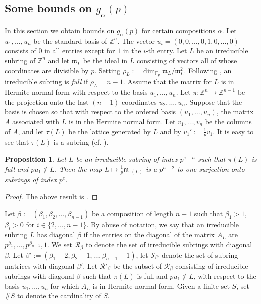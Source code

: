 \documentclass[a4paper]{amsart}
\newtheorem{proposition}[theorem]{Proposition}
\numberwithin{equation}{section}
\theoremstyle{remark}
\newcommand{\Z}{\mathbb{Z}}
\newcommand{\F}{\mathbb{F}}
\newcommand{\op}[1]{\operatorname{#1}}
\begin{document}
\subsection{Some bounds on $g_\alpha(p)$}\label{s 7.2}In this section we obtain bounds on $g_{\alpha}(p)$ for certain compositions $\alpha$. Let $u_1, \dots, u_n$ be the standard basis of $\Z^n$. The vector $u_i=(0,0,\dots, 0, 1, 0,\dots, 0)$ consists of $0$ in all entries except for $1$ in the $i$-th entry. Let $L$ be an irreducible subring of $\Z^n$ and let $\mathfrak{m}_L$ be the ideal in $L$ consisting of vectors all of whose coordinates are divisible by $p$. Setting $\rho_L:=\op{dim}_{\F_p} \mathfrak{m}_L/\mathfrak{m}_L^2$. Following \cite[p. 292, l.-1]{liu2007counting}, an irreducible subring is \emph{full} if $\rho_L=n-1$. Assume that the matrix for $L$ is in Hermite normal form with respect to the basis $u_1, \dots, u_n$. Let $\pi:\Z^n\rightarrow \Z^{n-1}$ be the projection onto the last $(n-1)$ coordinates $u_2, \dots, u_n$. Suppose that the basis is chosen so that with respect to the ordered basis $(u_1, \dots, u_n)$, the matrix $A$ associated with $L$ is in the Hermite normal form. Let $v_1, \dots, v_n$ be the columns of $A$, and let $\tau(L)$ be the lattice generated by $L$ and by $v_1':=\frac{1}{p} v_1$. It is easy to see that $\tau(L)$ is a subring (cf. \cite[p.291, l.-2]{liu2007counting}).
\begin{proposition}\label{liu prop5.6}
 Let $L$ be an irreducible subring of index $p^{e+n}$ such that $\pi(L)$ is full and $pu_1 \notin L$. Then the map $L \mapsto \frac{1}{p}\mathfrak{m}_{\tau(L)}$ is a $p^{n-2}$-to-one surjection onto subrings of index $p^e$.
\end{proposition}
\begin{proof}
The above result is \cite[Proposition 5.6]{liu2007counting}.
\end{proof}
Let $\beta := (\beta_1,\beta_2,\dots,\beta_{n-1})$ be a composition of length $n-1$ such that $\beta_1 > 1$, $\beta_i > 0$ for $i \in \{2,\dots,n-1\}$. By abuse of notation, we say that an irreducible subring $L$ has diagonal $\beta$ if the entries on the diagonal of the matrix $A_L$ are $p^{\beta_1}, \dots, p^{\beta_{n-1}},1$. We set $\mathcal{R_{\beta}}$ to denote the set of irreducible subrings with diagonal $\beta$. Let $\beta' := (\beta_1-2,\beta_2-1,\dots,\beta_{n-1}-1)$, let $\mathcal{S}_{\beta'}$ denote the set of subring matrices with diagonal $\beta'$. Let $\mathcal{R}'_\beta$ be the subset of $\mathcal{R}_\beta$ consisting of irreducible subrings with diagonal $\beta$ such that $\pi(L)$ is full and $pu_1\notin L$, with respect to the basis $u_1, \dots, u_n$ for which $A_L$ is in Hermite normal form. Given a finite set $S$, set $\# S$ to denote the cardinality of $S$. 
\end{document}
